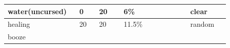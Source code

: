 \begin{longtable}{|>{\RaggedRight}p{0.23462\linewidth}|>{\RaggedRight}p{0.08075\linewidth}|>{\RaggedRight}p{0.10890\linewidth}|>{\RaggedRight}p{0.27027\linewidth}|>{\RaggedRight}p{0.16262\linewidth}|}
\hspace*{0pt}\ignorespaces{}\hspace*{0pt}water\footnotemark[24] (uncursed)&\hspace*{0pt}\ignorespaces{}\hspace*{0pt}0&\hspace*{0pt}\ignorespaces{}\hspace*{0pt}20&\hspace*{0pt}\ignorespaces{}\hspace*{0pt}6\%&\hspace*{0pt}\ignorespaces{}\hspace*{0pt}clear\\ \hline \hspace*{0pt}\ignorespaces{}\hspace*{0pt}healing\footnotemark[25]&\hspace*{0pt}\ignorespaces{}\hspace*{0pt}20&\hspace*{0pt}\ignorespaces{}\hspace*{0pt}20&\hspace*{0pt}\ignorespaces{}\hspace*{0pt}11.5\%&\hspace*{0pt}\ignorespaces{}\hspace*{0pt}random\footnotemark[26]\\ \hline \hspace*{0pt}\ignorespaces{}\hspace*{0pt}booze\footnotemark[27]&\hspace*{0pt
\end{longtable}

